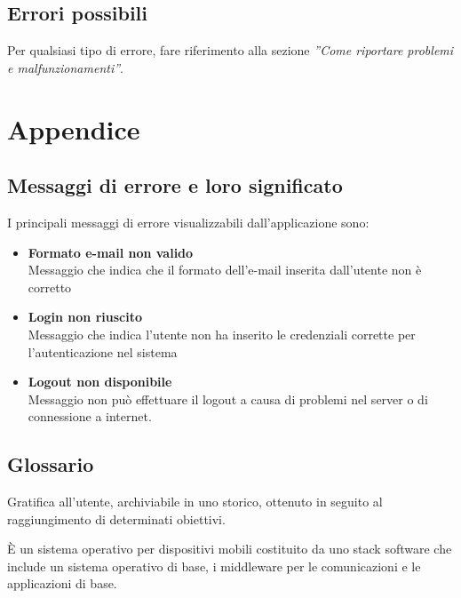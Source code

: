 \subsection{Errori possibili}
Per qualsiasi tipo di errore, fare riferimento alla sezione \emph{''Come riportare problemi e malfunzionamenti''}.


\newpage

\section{Appendice}

	\subsection{Messaggi di errore e loro significato}
	
I principali messaggi di errore visualizzabili dall'applicazione sono:

\begin{itemize}

\item \textbf{Formato e-mail non valido}\\
Messaggio che indica che il formato dell'e-mail inserita dall'utente non è corretto

\item \textbf{Login non riuscito}\\
Messaggio che indica l'utente non ha inserito le credenziali corrette per l'autenticazione nel sistema

\item \textbf{Logout non disponibile}\\
Messaggio non può effettuare il logout a causa di problemi nel server o di connessione a internet.

\end{itemize}	
	

	\subsection{Glossario}
	\label{glossario}


Gratifica all'utente, archiviabile in uno storico, ottenuto in seguito al raggiungimento di determinati obiettivi.

È un sistema operativo per dispositivi mobili costituito da uno stack software che include un sistema operativo di base, i middleware per le comunicazioni e le applicazioni di base.

